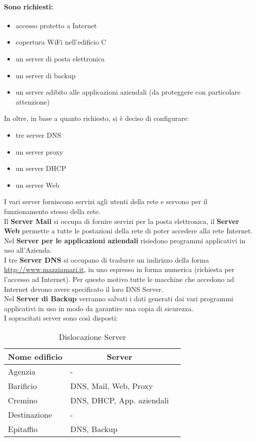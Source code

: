 \documentclass[a4paper,11pt]{article}
\begin{document}
\paragraph{Sono richiesti:} 
\begin{itemize}
\item accesso protetto a Internet
\item copertura WiFi nell'edificio C
\item un server di posta elettronica
\item un server di backup 
\item un server adibito alle applicazioni aziendali (da proteggere con particolare attenzione)
\end{itemize}
In oltre, in base a quanto richiesto, si è deciso di configurare:
\begin{itemize}
\item tre server DNS
\item un server proxy 
\item un server DHCP
\item un server Web
\end{itemize}
I vari server forniscono servizi agli utenti della rete e servono per il funzionamento stesso della rete.\\
Il \textbf{Server Mail} si occupa di fornire servizi per la posta elettronica, il \textbf{Server Web} permette a tutte le postazioni della rete di poter accedere alla rete Internet.\\
Nel \textbf{Server per le applicazioni aziendali} risiedono programmi applicativi in uso all’Azienda.\\
I tre \textbf{Server DNS} si occupano di tradurre un indirizzo della forma \url{http://www.mazziamari.it}, in uno espresso in forma numerica (richiesta per l’accesso ad Internet). Per questo motivo tutte le macchine che accedono ad Internet devono avere specificato il loro DNS Server.\\
Nel \textbf{Server di Backup} verranno salvati i dati generati dai vari programmi applicativi in uso in modo da garantire una copia di sicurezza.\\
I sopracitati server sono così disposti:
\begin{table}[H]
\centering
\label{riepilogo}
\begin{tabular}{|l|l|l|}
\hline
\multicolumn{1}{|c|}{\textbf{Nome edificio}} & \multicolumn{1}{c|}{\textbf{Server}} \\ \hline
Agenzia & - \\ \hline
Barificio & DNS, Mail, Web, Proxy \\ \hline
Cremino & DNS, DHCP, App. aziendali \\ \hline
Destinazione & - \\ \hline
Epitaffio & DNS, Backup \\ \hline
\end{tabular}
\caption{Dislocazione Server}
\end{table}
\newpage
\end{document}
